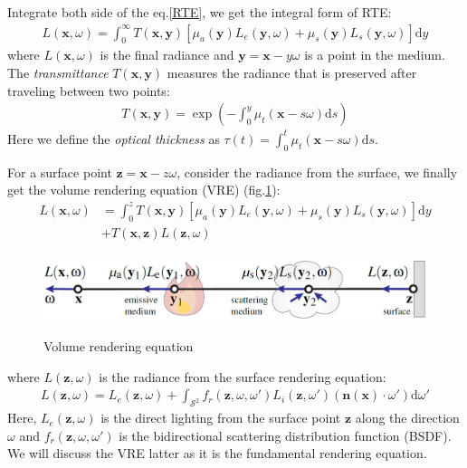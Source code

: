 \documentclass[acmtog]{acmart}
\begin{document}
Integrate both side of the eq.\eqref{RTE}, we get the integral form of RTE:
\begin{equation}
	\begin{aligned}
	L(\mathbf x, \omega)=\int_0^{\infty}T(\mathbf x, \mathbf y)\left[\mu_a(\mathbf y)L_e(\mathbf y, \omega)+\mu_s(\mathbf y)L_s(\mathbf y, \omega)\right]\mathrm dy\label{intRTE}
	\end{aligned}
\end{equation}
where $L(\mathbf x, \omega)$ is the final radiance and $\mathbf y=\mathbf x-y\omega$ is a point in the medium.
The \textit{transmittance} $T(\mathbf x, \mathbf y)$ measures the radiance that is preserved after traveling between two points:
\begin{equation}
	\begin{aligned}
	T(\mathbf x, \mathbf y)=\exp\left(-\int_0^y\mu_t(\mathbf x-s\omega)\mathrm ds\right)
	\end{aligned}
\end{equation}
Here we define the \textit{optical thickness} as $\tau(t)=\int_0^t\mu_t(\mathbf x-s\omega)\mathrm ds$.

For a surface point $\mathbf z=\mathbf x-z\omega$, consider the radiance from the surface, we finally get the volume rendering equation (VRE) (fig.\ref{VRE}):
\begin{equation}
	\begin{aligned}
	L(\mathbf x, \omega)&=\int_0^zT(\mathbf x, \mathbf y)\left[\mu_a(\mathbf y)L_e(\mathbf y, \omega)+\mu_s(\mathbf y)L_s(\mathbf y, \omega)\right]\mathrm dy\\
	&+T(\mathbf x, \mathbf z)L(\mathbf z, \omega)
	\end{aligned}
\end{equation}

\begin{figure}[htbp]
	\includegraphics[width=\linewidth]{figure/volume rendering equation.png}
	\label{VRE}
	\caption{Volume rendering equation}
\end{figure}

where $L(\mathbf z, \omega)$ is the radiance from the surface rendering equation:
\begin{equation}
	\begin{aligned}
	L(\mathbf z, \omega)=L_e(\mathbf z, \omega)+\int_{\mathcal S^2}f_r(\mathbf z, \omega, \omega')L_i(\mathbf z,\omega')(\mathbf n(\mathbf x)\cdot\omega')\mathrm{d}\omega'
	\end{aligned}
\end{equation}
Here, $L_e(\mathbf z, \omega)$ is the direct lighting from the surface point $\mathbf z$ along the direction $\omega$ and $f_r(\mathbf z, \omega, \omega')$ is the bidirectional scattering distribution function (BSDF).
We will discuss the VRE latter as it is the fundamental rendering equation.
\end{document}
